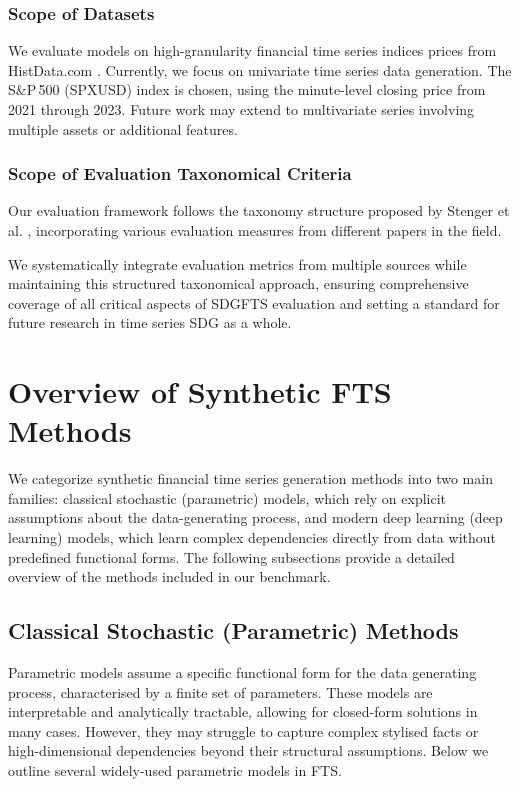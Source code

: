 \documentclass[sigconf]{acmart}
\begin{document}
      \subsubsection{Scope of Datasets}
      We evaluate models on high-granularity financial time series 
      indices prices from HistData.com \cite{histdata}. Currently, we 
      focus on univariate time series data generation. The S\&P\,500 
      (SPXUSD) index is chosen, using the minute-level closing price 
      from 2021 through 2023. Future work may extend to multivariate 
      series involving multiple assets or additional features.

      \subsubsection{Scope of Evaluation Taxonomical Criteria}
      Our evaluation framework follows the taxonomy structure 
      proposed by Stenger et al. \cite{Stenger24}, incorporating 
      various evaluation measures from different papers in the 
      field.

      We systematically integrate evaluation metrics from multiple 
      sources while maintaining this structured taxonomical 
      approach, ensuring comprehensive coverage of all critical 
      aspects of SDGFTS evaluation and setting a standard for 
      future research in time series SDG as a whole.

\section{Overview of Synthetic FTS Methods}
  We categorize synthetic financial time series generation methods into
  two main families: classical stochastic (parametric) models, which
  rely on explicit assumptions about the data-generating process, and
  modern deep learning (deep learning) models, which learn complex
  dependencies directly from data without predefined functional forms.
  The following subsections provide a detailed overview of the methods
  included in our benchmark.


  \subsection{Classical Stochastic (Parametric) Methods}
  \label{sub:parametric-methods}
    Parametric models assume a specific functional form for the 
    data generating process, characterised by a finite set of 
    parameters. These models are interpretable and analytically 
    tractable, allowing for closed-form solutions in many cases. 
    However, they may struggle to capture complex stylised facts 
    or high-dimensional dependencies beyond their structural 
    assumptions. Below we outline several widely-used parametric 
    models in FTS.\\
\end{document}
